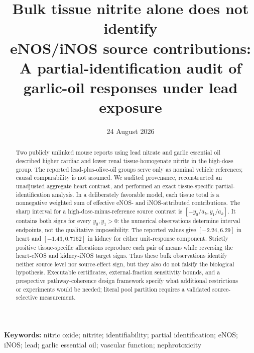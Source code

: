 \documentclass[11pt]{article}
\title{\vspace{-1.5em}\textbf{Bulk tissue nitrite alone does not identify\\[-0.05em]eNOS/iNOS source contributions:}\\[0.25em]
\large A partial-identification audit of garlic-oil responses under lead exposure}
\author{}
\date{24 August 2026}
\begin{document}
\maketitle
\thispagestyle{titlepage}

\begin{abstract}
Two publicly unlinked mouse reports using lead nitrate and garlic essential oil described higher cardiac and lower renal tissue-homogenate nitrite in the high-dose group. The reported lead-plus-olive-oil groups serve only as nominal vehicle references; causal comparability is not assumed. We audited provenance, reconstructed an unadjusted aggregate heart contrast, and performed an exact tissue-specific partial-identification analysis. In a deliberately favorable model, each tissue total is a nonnegative weighted sum of effective eNOS- and iNOS-attributed contributions. The sharp interval for a high-dose-minus-reference source contrast is $[-y_0/a_k,y_1/a_k]$. It contains both signs for every $y_0,y_1>0$: the numerical observations determine interval endpoints, not the qualitative impossibility. The reported values give $[-2.24,6.29]$ in heart and $[-1.43,0.7162]$ in kidney for either unit-response component. Strictly positive tissue-specific allocations reproduce each pair of means while reversing the heart-eNOS and kidney-iNOS target signs. Thus these bulk observations identify neither source level nor source-effect sign, but they also do not falsify the biological hypothesis. Executable certificates, external-fraction sensitivity bounds, and a prospective pathway-coherence design framework specify what additional restrictions or experiments would be needed; literal pool partition requires a validated source-selective measurement.
\end{abstract}

\noindent\textbf{Keywords:} nitric oxide; nitrite; identifiability; partial identification; eNOS; iNOS; lead; garlic essential oil; vascular function; nephrotoxicity

\begin{center}
\end{center}
\end{document}
